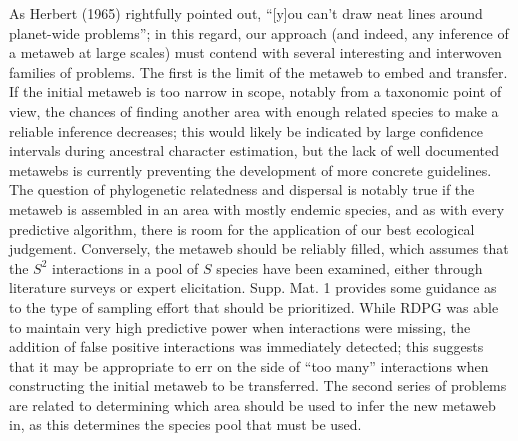 \documentclass[11pt]{article}
\begin{document}
As Herbert (1965) rightfully pointed out, ``{[}y{]}ou can't draw neat
lines around planet-wide problems''; in this regard, our approach (and
indeed, any inference of a metaweb at large scales) must contend with
several interesting and interwoven families of problems. The first is
the limit of the metaweb to embed and transfer. If the initial metaweb
is too narrow in scope, notably from a taxonomic point of view, the
chances of finding another area with enough related species to make a
reliable inference decreases; this would likely be indicated by large
confidence intervals during ancestral character estimation, but the lack
of well documented metawebs is currently preventing the development of
more concrete guidelines. The question of phylogenetic relatedness and
dispersal is notably true if the metaweb is assembled in an area with
mostly endemic species, and as with every predictive algorithm, there is
room for the application of our best ecological judgement. Conversely,
the metaweb should be reliably filled, which assumes that the \(S^2\)
interactions in a pool of \(S\) species have been examined, either
through literature surveys or expert elicitation. Supp. Mat. 1 provides
some guidance as to the type of sampling effort that should be
prioritized. While RDPG was able to maintain very high predictive power
when interactions were missing, the addition of false positive
interactions was immediately detected; this suggests that it may be
appropriate to err on the side of ``too many'' interactions when
constructing the initial metaweb to be transferred. The second series of
problems are related to determining which area should be used to infer
the new metaweb in, as this determines the species pool that must be
used.
\end{document}
